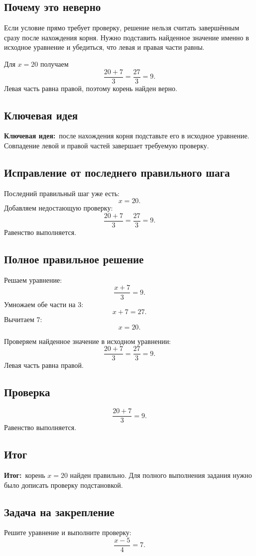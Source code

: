 \documentclass[a4paper,12pt]{article}
\newcommand{\KeyIdea}{\textcolor{Accent}{\textbf{Ключевая идея:}}}
\newcommand{\Outcome}{\textcolor{Result}{\textbf{Итог:}}}
\begin{document}
\subsection*{Почему это неверно}
Если условие прямо требует проверку, решение нельзя считать завершённым сразу после нахождения корня. Нужно подставить найденное значение именно в исходное уравнение и убедиться, что левая и правая части равны.

Для $x=20$ получаем
\[
\frac{20+7}{3}=\frac{27}{3}=9.
\]
Левая часть равна правой, поэтому корень найден верно.

\subsection*{Ключевая идея}
\KeyIdea\ после нахождения корня подставьте его в исходное уравнение. Совпадение левой и правой частей завершает требуемую проверку.

\subsection*{Исправление от последнего правильного шага}
Последний правильный шаг уже есть:
\[
x=20.
\]
Добавляем недостающую проверку:
\[
\frac{20+7}{3}=\frac{27}{3}=9.
\]
Равенство выполняется.

\subsection*{Полное правильное решение}
Решаем уравнение:
\[
\frac{x+7}{3}=9.
\]
Умножаем обе части на $3$:
\[
x+7=27.
\]
Вычитаем $7$:
\[
x=20.
\]

Проверяем найденное значение в исходном уравнении:
\[
\frac{20+7}{3}=\frac{27}{3}=9.
\]
Левая часть равна правой.

\subsection*{Проверка}
\[
\frac{20+7}{3}=9.
\]
Равенство выполняется.

\subsection*{Итог}
\Outcome\ корень $x=20$ найден правильно. Для полного выполнения задания нужно было дописать проверку подстановкой.

\subsection*{Задача на закрепление}
Решите уравнение и выполните проверку:
\[
\frac{x-5}{4}=7.
\]
\end{document}
